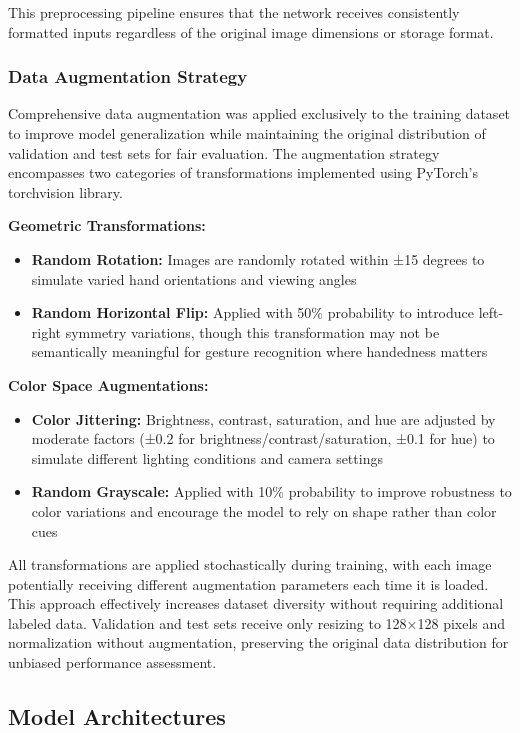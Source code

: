 \documentclass[12pt,a4paper]{article}
\begin{document}
This preprocessing pipeline ensures that the network receives consistently formatted inputs regardless of the original image dimensions or storage format.

\subsubsection{Data Augmentation Strategy}

Comprehensive data augmentation was applied exclusively to the training dataset to improve model generalization while maintaining the original distribution of validation and test sets for fair evaluation. The augmentation strategy encompasses two categories of transformations implemented using PyTorch's torchvision library.

\textbf{Geometric Transformations:}
\begin{itemize}
    \item \textbf{Random Rotation:} Images are randomly rotated within ±15 degrees to simulate varied hand orientations and viewing angles
    \item \textbf{Random Horizontal Flip:} Applied with 50\% probability to introduce left-right symmetry variations, though this transformation may not be semantically meaningful for gesture recognition where handedness matters
\end{itemize}

\textbf{Color Space Augmentations:}
\begin{itemize}
    \item \textbf{Color Jittering:} Brightness, contrast, saturation, and hue are adjusted by moderate factors (±0.2 for brightness/contrast/saturation, ±0.1 for hue) to simulate different lighting conditions and camera settings
    \item \textbf{Random Grayscale:} Applied with 10\% probability to improve robustness to color variations and encourage the model to rely on shape rather than color cues
\end{itemize}

All transformations are applied stochastically during training, with each image potentially receiving different augmentation parameters each time it is loaded. This approach effectively increases dataset diversity without requiring additional labeled data. Validation and test sets receive only resizing to 128×128 pixels and normalization without augmentation, preserving the original data distribution for unbiased performance assessment.

\subsection{Model Architectures}
\end{document}
